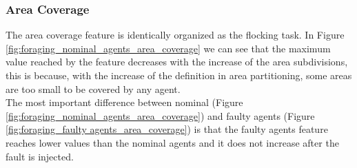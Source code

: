 \documentclass[../../Thesis.tex]{subfiles}
\begin{document}
			\subsubsection{Area Coverage}
				The area coverage feature is identically organized as the flocking task. In Figure \ref{fig:foraging_nominal_agents_area_coverage} we can see that the maximum value reached by the feature decreases with the increase of the area subdivisions, this is because, with the increase of the definition in area partitioning, some areas are too small to be covered by any agent.\\
				The most important difference between nominal (Figure \ref{fig:foraging_nominal_agents_area_coverage}) and faulty agents (Figure \ref{fig:foraging_faulty agents_area_coverage}) is that the faulty agents feature reaches lower values than the nominal agents and it does not increase after the fault is injected. 
\end{document}
